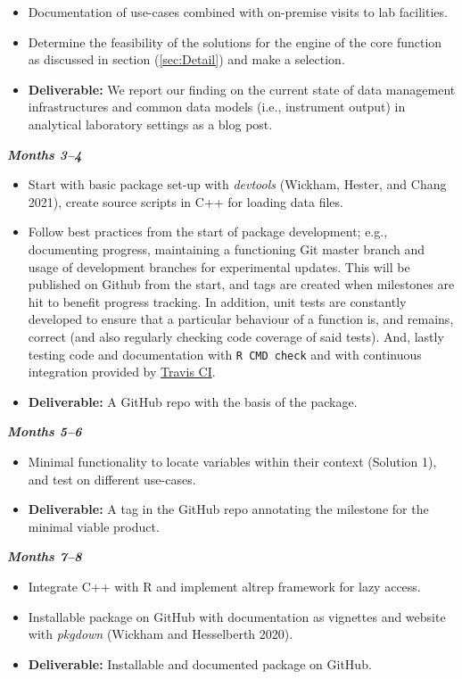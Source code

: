 \documentclass[]{article}
\providecommand{\tightlist}{%
  \setlength{\itemsep}{0pt}\setlength{\parskip}{0pt}}
\begin{document}
\begin{itemize}
\tightlist
\item
  Documentation of use-cases combined with on-premise visits to lab facilities.
\item
  Determine the feasibility of the solutions for the engine of the core function as discussed in section (\ref{sec:Detail}) and make a selection.
\item
  \textbf{Deliverable:} We report our finding on the current state of data management infrastructures and common data models (i.e., instrument output) in analytical laboratory settings as a blog post.
\end{itemize}

\textbf{\emph{Months 3--4}}

\begin{itemize}
\tightlist
\item
  Start with basic package set-up with \emph{devtools} (Wickham, Hester, and Chang 2021), create source scripts in C++ for loading data files.
\item
  Follow best practices from the start of package development; e.g., documenting progress, maintaining a functioning Git master branch and usage of development branches for experimental updates. This will be published on Github from the start, and tags are created when milestones are hit to benefit progress tracking. In addition, unit tests are constantly developed to ensure that a particular behaviour of a function is, and remains, correct (and also regularly checking code coverage of said tests). And, lastly testing code and documentation with \texttt{R\ CMD\ check} and with continuous integration provided by \href{https://travis-ci.org/}{Travis CI}.
\item
  \textbf{Deliverable:} A GitHub repo with the basis of the package.
\end{itemize}

\textbf{\emph{Months 5--6}}

\begin{itemize}
\tightlist
\item
  Minimal functionality to locate variables within their context (Solution 1), and test on different use-cases.
\item
  \textbf{Deliverable:} A tag in the GitHub repo annotating the milestone for the minimal viable product.
\end{itemize}

\textbf{\emph{Months 7--8}}

\begin{itemize}
\tightlist
\item
  Integrate C++ with R and implement altrep framework for lazy access.
\item
  Installable package on GitHub with documentation as vignettes and website with \emph{pkgdown} (Wickham and Hesselberth 2020).
\item
  \textbf{Deliverable:} Installable and documented package on GitHub.
\end{itemize}
\end{document}

